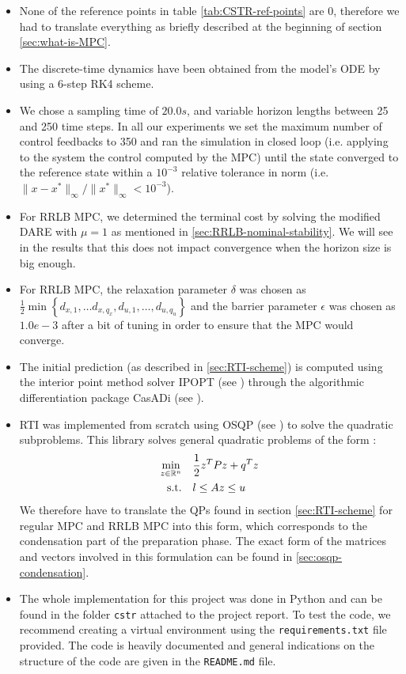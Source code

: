 \documentclass[12pt]{article}
\begin{document}
\begin{itemize}[label=\textbullet]
	\item None of the reference points in table \ref{tab:CSTR-ref-points} are 0, therefore we had to translate everything as briefly described at the beginning of section \ref{sec:what-is-MPC}.

	\item The discrete-time dynamics have been obtained from the model's ODE by using a 6-step RK4 scheme.

	\item We chose a sampling time of $20.0s$, and variable horizon lengths between 25 and 250 time steps.
	In all our experiments we set the maximum number of control feedbacks to 350 and ran the simulation in closed loop (i.e. applying to the system the control computed by the MPC) until the state converged to the reference state within a $10^{-3}$ relative tolerance in norm (i.e. $\|x-x^*\|_\infty/\|x^*\|_\infty<10^{-3}$).

	\item For RRLB MPC, we determined the terminal cost by solving the modified DARE with $\mu=1$ as mentioned in \ref{sec:RRLB-nominal-stability}.
	We will see in the results that this does not impact convergence when the horizon size is big enough.

	\item For RRLB MPC, the relaxation parameter $\delta$ was chosen as $\frac{1}{2}\min\left\{ d_{x,1},\dots d_{x,q_x},d_{u,1},\dots,d_{u,q_u} \right\}$ and the barrier parameter $\epsilon$ was chosen as $1.0e-3$ after a bit of tuning in order to ensure that the MPC would converge.

	\item The initial prediction (as described in \ref{sec:RTI-scheme}) is computed using the interior point method solver IPOPT (see \cite{ipopt}) through the algorithmic differentiation package CasADi (see \cite{casadi}).

	\item RTI was implemented from scratch using OSQP (see \cite{osqp}) to solve the quadratic subproblems.
	This library solves general quadratic problems of the form :
	\begin{align*}
		\underset{z\in\mathbb{R}^n}{\min}&\quad\frac{1}{2}z^TPz+q^Tz\\
		\text{s.t.}&\quad l\leq Az\leq u
	\end{align*}
	We therefore have to translate the QPs found in section \ref{sec:RTI-scheme} for regular MPC and RRLB MPC into this form, which corresponds to the condensation part of the preparation phase.
	The exact form of the matrices and vectors involved in this formulation can be found in \ref{sec:osqp-condensation}.

	\item The whole implementation for this project was done in Python and can be found in the folder \verb|cstr| attached to the project report.
	To test the code, we recommend creating a virtual environment using the \verb|requirements.txt| file provided.
	The code is heavily documented and general indications on the structure of the code are given in the \verb|README.md| file.
\end{itemize}
\end{document}
